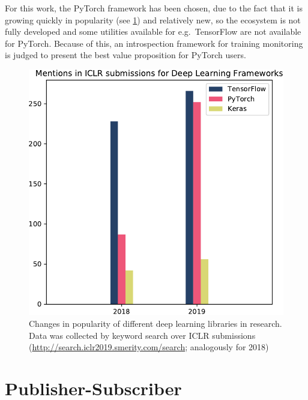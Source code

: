 For this work, the PyTorch framework has been chosen, due to the fact
that it is growing quickly in popularity (see \cref{fig:popularity}) and
relatively new, so the ecosystem is not fully developed and some
utilities available for e.g.~TensorFlow are not available for PyTorch.
Because of this, an introspection framework for training monitoring is
judged to present the best value proposition for PyTorch users.

\begin{figure}
    \hypertarget{fig:popularity}{%
        \centering
        \includegraphics[max width=\textwidth]{gfx/diagrams/framework_popularity/popularity.pdf}
        \caption[Changes in popularity of different deep learning libraries in
        research]{Changes in popularity of different deep learning libraries in
            research. Data was collected by keyword search over ICLR submissions
            (\href{http://search.iclr2019.smerity.com/search/}{http://search.iclr2019.smerity.com/search};
        analogously for 2018)}\label{fig:popularity}
    }
\end{figure}

\hypertarget{sec:pubsub}{%
\section{Publisher-Subscriber}\label{sec:pubsub}}

